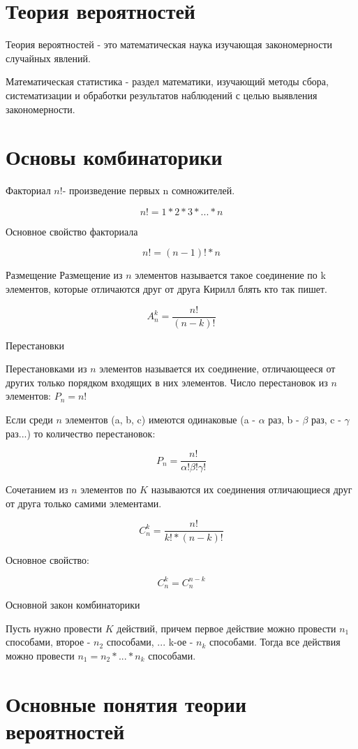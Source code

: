 \documentclass[a4paper]{article}
\begin{document}
\section{Теория вероятностей}
Теория вероятностей - это математическая наука изучающая закономерности случайных явлений.

Математическая статистика - раздел математики, изучающий 
методы сбора, систематизации и обработки результатов наблюдений с целью выявления закономерности.

\section{Основы комбинаторики}

Факториал $n!$- произведение первых n сомножителей.

$$ n! = 1*2*3*...*n $$

Основное свойство факториала

$$ n! = (n-1)! * n $$

Размещение
Размещение из $n$ элементов называется такое соединение по k элементов, которые отличаются друг от друга Кирилл блять кто так пишет.

$$ A_n^k = \frac{n!}{(n-k)!} $$

Перестановки

Перестановками из $n$ элементов называется их соединение, отличающееся от других только порядком входящих в них элементов.
Число перестановок из $n$ элементов: $P_n = n!$

Если среди $n$ элементов (a, b, c) имеются одинаковые (a - $\alpha$ раз, b - $\beta$ раз, c - $\gamma$ раз...) то количество перестановок:

$$ P_n = \frac{n!}{\alpha!\beta!\gamma!}$$

Сочетанием из $n$ элементов по $K$ называются их соединения отличающиеся друг от друга только самими элементами.

$$ C_n^k = \frac{n!}{k!*(n-k)!} $$

Основное свойство:

$$ C_n^k = C_n^{n-k}$$

Основной закон комбинаторики

Пусть нужно провести $K$ действий, причем первое действие можно провести $n_1$ способами, второе - $n_2$ способами, ... k-ое - $n_k$ способами. Тогда все действия можно провести 
$ n_1 = n_2 * ... * n_k$ способами.

\section{Основные понятия теории вероятностей}
\end{document}
